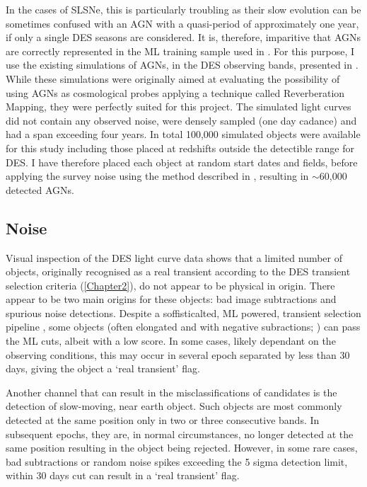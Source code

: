 In the cases of SLSNe, this is particularly troubling as their slow evolution can be sometimes confused with an AGN with a quasi-period of approximately one year, if only a single DES seasons are considered. It is, therefore, imparitive that AGNs are correctly represented in the ML training sample used in . For this purpose, I use the existing simulations of AGNs, in the DES observing bands, presented in \citet{Honig2016}. While these simulations were originally aimed at evaluating the possibility of using AGNs as cosmological probes applying a technique called Reverberation Mapping, they were perfectly suited for this project. The simulated light curves did not contain any observed noise, were densely sampled (one day cadance) and had a span exceeding four years. In total 100,000 simulated objects were available for this study including those placed at redshifts outside the detectible range for DES. I have therefore placed each object at random start dates and fields, before applying the survey noise using the method described in , resulting in $\sim$60,000 detected AGNs.

\subsection{Noise}
Visual inspection of the DES light curve data shows that a limited number of objects, originally recognised as a real transient according to the DES transient selection criteria (\cref{Chapter2}), do not appear to be physical in origin. There appear to be two main origins for these objects: bad image subtractions and spurious noise detections. Despite a soffisticalted, ML powered, transient selection pipeline \citep{Goldstein2015}, some objects (often elongated and with negative subractions; ) can pass the ML cuts, albeit with a low score. In some cases, likely dependant on the observing conditions, this may occur in several epoch separated by less than 30 days, giving the object a `real transient' flag.

Another channel that can result in the misclassifications of candidates is the detection of slow-moving, near earth object. Such objects are most commonly detected at the same position only in two or three consecutive bands. In subsequent epochs, they are, in normal circumstances, no longer detected at the same position resulting in the object being rejected. However, in some rare cases, bad subtractions or random noise spikes exceeding the 5 sigma detection limit, within 30 days cut can result in a `real transient' flag.

